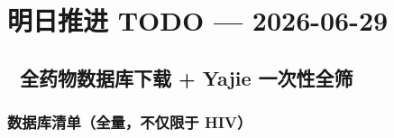 \documentclass[
  12pt,
]{ctexart}
\author{SCX}
\date{2026}
\begin{document}
\section{明日推进 TODO ---
2026-06-29}\label{ux660eux65e5ux63a8ux8fdb-todo-2026-06-29}

\subsection{🔴 全药物数据库下载 + Yajie
一次性全筛}\label{ux5168ux836fux7269ux6570ux636eux5e93ux4e0bux8f7d-yajie-ux4e00ux6b21ux6027ux5168ux7b5b}

\subsubsection{数据库清单（全量，不仅限于
HIV）}\label{ux6570ux636eux5e93ux6e05ux5355ux5168ux91cfux4e0dux4ec5ux9650ux4e8e-hiv}
\end{document}
